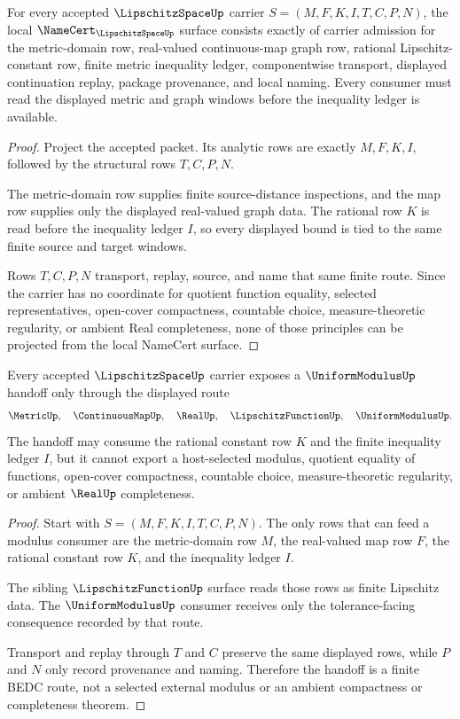 \begin{theorem}
\label{thm:lipschitz-space-namecert-obligations}
For every accepted $\LipschitzSpaceUp$ carrier $S=(M,F,K,I,T,C,P,N)$, the local $\NameCert_{\LipschitzSpaceUp}$ surface consists exactly of carrier admission for the metric-domain row, real-valued continuous-map graph row, rational Lipschitz-constant row, finite metric inequality ledger, componentwise transport, displayed continuation replay, package provenance, and local naming. Every consumer must read the displayed metric and graph windows before the inequality ledger is available.
\end{theorem}
\begin{proof}
Project the accepted packet. Its analytic rows are exactly $M,F,K,I$, followed by the structural rows $T,C,P,N$.

The metric-domain row supplies finite source-distance inspections, and the map row supplies only the displayed real-valued graph data. The rational row $K$ is read before the inequality ledger $I$, so every displayed bound is tied to the same finite source and target windows.

Rows $T,C,P,N$ transport, replay, source, and name that same finite route. Since the carrier has no coordinate for quotient function equality, selected representatives, open-cover compactness, countable choice, measure-theoretic regularity, or ambient Real completeness, none of those principles can be projected from the local NameCert surface.
\end{proof}

\begin{theorem}
\label{thm:lipschitz-space-uniform-modulus-handoff}
Every accepted $\LipschitzSpaceUp$ carrier exposes a $\UniformModulusUp$ handoff only through the displayed route
$$
\MetricUp,\quad \ContinuousMapUp,\quad \RealUp,\quad \LipschitzFunctionUp,\quad \UniformModulusUp .
$$
The handoff may consume the rational constant row $K$ and the finite inequality ledger $I$, but it cannot export a host-selected modulus, quotient equality of functions, open-cover compactness, countable choice, measure-theoretic regularity, or ambient $\RealUp$ completeness.
\end{theorem}
\begin{proof}
Start with $S=(M,F,K,I,T,C,P,N)$. The only rows that can feed a modulus consumer are the metric-domain row $M$, the real-valued map row $F$, the rational constant row $K$, and the inequality ledger $I$.

The sibling $\LipschitzFunctionUp$ surface reads those rows as finite Lipschitz data. The $\UniformModulusUp$ consumer receives only the tolerance-facing consequence recorded by that route.

Transport and replay through $T$ and $C$ preserve the same displayed rows, while $P$ and $N$ only record provenance and naming. Therefore the handoff is a finite BEDC route, not a selected external modulus or an ambient compactness or completeness theorem.
\end{proof}

